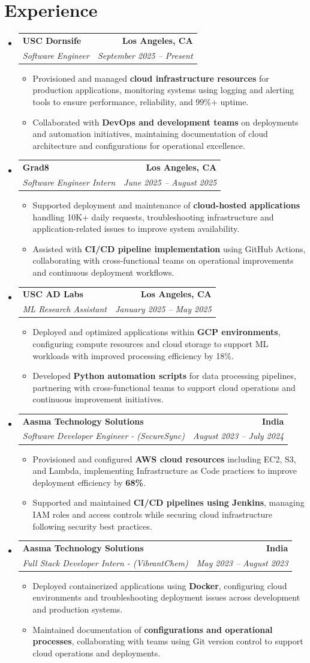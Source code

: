 \documentclass[letterpaper,10pt]{article}
\makeatletter
\newcommand{\resumeItem}[1]{\item\small{{#1 \vspace{-2pt}}}}
\newcommand{\resumeSubheading}[4]{\vspace{-1pt}\item\begin{tabular*}{1.0\textwidth}[t]{l@{\extracolsep{\fill}}r}\textbf{#1} & \textbf{\small #2} \\\textit{\small#3} & \textit{\small #4} \\\end{tabular*}\vspace{-2pt}}
\newcommand{\resumeSubHeadingListStart}{\begin{itemize}[leftmargin=0.0in, label={}]}
\newcommand{\resumeSubHeadingListEnd}{\end{itemize}}
\newcommand{\resumeItemListStart}{\begin{itemize}[leftmargin=0.15in,label=\textbullet,itemsep=2pt,topsep=0pt,parsep=0pt,partopsep=0pt]}
\newcommand{\resumeItemListEnd}{\end{itemize}\vspace{-4pt}}
\makeatother
\begin{document}
\section{Experience}
\resumeSubHeadingListStart
\resumeSubheading{USC Dornsife}{Los Angeles, CA}{Software Engineer}{September 2025 -- Present}
\resumeItemListStart
\resumeItem{Provisioned and managed \textbf{cloud infrastructure resources} for production applications, monitoring systems using logging and alerting tools to ensure performance, reliability, and 99\%+ uptime.}
\resumeItem{Collaborated with \textbf{DevOps and development teams} on deployments and automation initiatives, maintaining documentation of cloud architecture and configurations for operational excellence.}
\resumeItemListEnd
\resumeSubheading{Grad8}{Los Angeles, CA}{Software Engineer Intern}{June 2025 -- August 2025}
\resumeItemListStart
\resumeItem{Supported deployment and maintenance of \textbf{cloud-hosted applications} handling 10K+ daily requests, troubleshooting infrastructure and application-related issues to improve system availability.}
\resumeItem{Assisted with \textbf{CI/CD pipeline implementation} using GitHub Actions, collaborating with cross-functional teams on operational improvements and continuous deployment workflows.}
\resumeItemListEnd
\resumeSubheading{USC AD Labs}{Los Angeles, CA}{ML Research Assistant}{January 2025 -- May 2025}
\resumeItemListStart
\resumeItem{Deployed and optimized applications within \textbf{GCP environments}, configuring compute resources and cloud storage to support ML workloads with improved processing efficiency by 18\%.}
\resumeItem{Developed \textbf{Python automation scripts} for data processing pipelines, partnering with cross-functional teams to support cloud operations and continuous improvement initiatives.}
\resumeItemListEnd
\resumeSubheading{Aasma Technology Solutions}{India}{Software Developer Engineer - (SecureSync)}{August 2023 -- July 2024}
\resumeItemListStart
\resumeItem{Provisioned and configured \textbf{AWS cloud resources} including EC2, S3, and Lambda, implementing Infrastructure as Code practices to improve deployment efficiency by \textbf{68\%}.}
\resumeItem{Supported and maintained \textbf{CI/CD pipelines using Jenkins}, managing IAM roles and access controls while securing cloud infrastructure following security best practices.}
\resumeItemListEnd
\resumeSubheading{Aasma Technology Solutions}{India}{Full Stack Developer Intern - (VibrantChem)}{May 2023 -- August 2023}
\resumeItemListStart
\resumeItem{Deployed containerized applications using \textbf{Docker}, configuring cloud environments and troubleshooting deployment issues across development and production systems.}
\resumeItem{Maintained documentation of \textbf{configurations and operational processes}, collaborating with teams using Git version control to support cloud operations and deployments.}
\resumeItemListEnd
\resumeSubHeadingListEnd
\vspace{-14pt}
\end{document}
